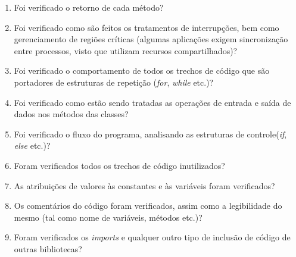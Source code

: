 \begin{enumerate}
	\item Foi verificado o retorno de cada método?
	\item Foi verificado como são feitos os tratamentos de interrupções, bem como gerenciamento de regiões críticas (algumas aplicações exigem sincronização entre processos, visto que utilizam recursos compartilhados)?
	\item Foi verificado o comportamento de todos os trechos de código que são portadores de estruturas de repetição (\textit{for}, \textit{while} etc.)?
	\item Foi verificado como estão sendo tratadas as operações de entrada e saída de dados nos métodos das classes?
	\item Foi verificado o fluxo do programa, analisando as estruturas de controle(\textit{if}, \textit{else} etc.)?
	\item Foram verificados todos os trechos de código inutilizados?
	\item As atribuições de valores às constantes e às variáveis foram verificados?
	\item Os comentários do código foram verificados, assim como a legibilidade do mesmo (tal como nome de variáveis, métodos etc.)?
	\item Foram verificados os \textit{imports} e qualquer outro tipo de inclusão de código de outras bibliotecas?
\end{enumerate}